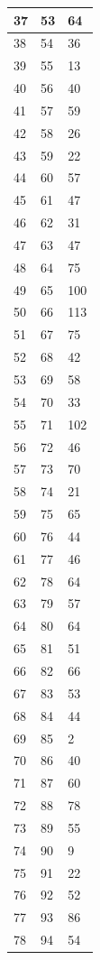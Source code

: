 \begin{tabular}{p{}p{}p{}}
\hline
37 & 53 & 64 \\
\hline
38 & 54 & 36 \\
\hline
39 & 55 & 13 \\
\hline
40 & 56 & 40 \\
\hline
41 & 57 & 59 \\
\hline
42 & 58 & 26 \\
\hline
43 & 59 & 22 \\
\hline
44 & 60 & 57 \\
\hline
45 & 61 & 47 \\
\hline
46 & 62 & 31 \\
\hline
47 & 63 & 47 \\
\hline
48 & 64 & 75 \\
\hline
49 & 65 & 100 \\
\hline
50 & 66 & 113 \\
\hline
51 & 67 & 75 \\
\hline
52 & 68 & 42 \\
\hline
53 & 69 & 58 \\
\hline
54 & 70 & 33 \\
\hline
55 & 71 & 102 \\
\hline
56 & 72 & 46 \\
\hline
57 & 73 & 70 \\
\hline
58 & 74 & 21 \\
\hline
59 & 75 & 65 \\
\hline
60 & 76 & 44 \\
\hline
61 & 77 & 46 \\
\hline
62 & 78 & 64 \\
\hline
63 & 79 & 57 \\
\hline
64 & 80 & 64 \\
\hline
65 & 81 & 51 \\
\hline
66 & 82 & 66 \\
\hline
67 & 83 & 53 \\
\hline
68 & 84 & 44 \\
\hline
69 & 85 & 2 \\
\hline
70 & 86 & 40 \\
\hline
71 & 87 & 60 \\
\hline
72 & 88 & 78 \\
\hline
73 & 89 & 55 \\
\hline
74 & 90 & 9 \\
\hline
75 & 91 & 22 \\
\hline
76 & 92 & 52 \\
\hline
77 & 93 & 86 \\
\hline
78 & 94 & 54 \\

\end{tabular}
